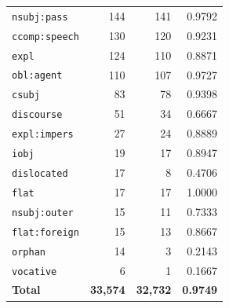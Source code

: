\begin{table}[ht]
\begin{tabular}{lrrr}
\texttt{nsubj\!:\!pass} & 144 & 141 & 0.9792 \\
\texttt{ccomp\!:\!speech} & 130 & 120 & 0.9231 \\
\texttt{expl} & 124 & 110 & 0.8871 \\
\texttt{obl\!:\!agent} & 110 & 107 & 0.9727 \\
\texttt{csubj} & 83 & 78 & 0.9398 \\
\texttt{discourse} & 51 & 34 & 0.6667 \\
\texttt{expl\!:\!impers} & 27 & 24 & 0.8889 \\
\texttt{iobj} & 19 & 17 & 0.8947 \\
\texttt{dislocated} & 17 & 8 & 0.4706 \\
\texttt{flat} & 17 & 17 & 1.0000 \\
\texttt{nsubj\!:\!outer} & 15 & 11 & 0.7333 \\
\texttt{flat\!:\!foreign} & 15 & 13 & 0.8667 \\
\texttt{orphan} & 14 & 3 & 0.2143 \\
\texttt{vocative} & 6 & 1 & 0.1667 \\
\midrule
\textbf{Total} & \textbf{33,574} & \textbf{32,732} & \textbf{0.9749} \\
\bottomrule
\end{tabular}
\end{table}
